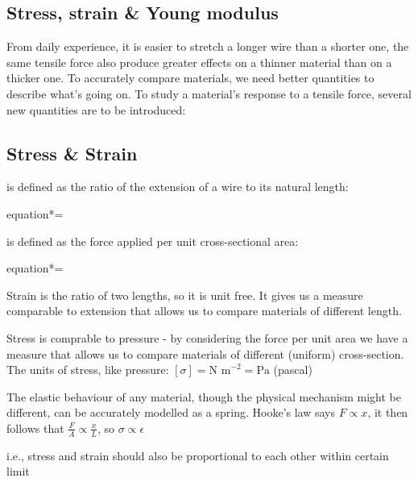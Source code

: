 \subsection{Stress, strain \& Young modulus}

From daily experience, it is easier to stretch a longer wire than a shorter one, the same tensile force also produce greater effects on a thinner material than on a thicker one. To accurately compare materials, we need better quantities to describe what's going on. To study a material's response to a tensile force, several new quantities are to be introduced:

\subsection{Stress \& Strain}

\begin{ilight}
	\centering {} is defined as the ratio of the extension of a wire to its natural length: \begin{empheq}[box=\tcbhighmath]{equation*}{\epsilon = }	\end{empheq}
\end{ilight}

\begin{ilight}
	\centering {} is defined as the force applied per unit cross-sectional area: 
	    \begin{empheq}[box=\tcbhighmath]{equation*}{\sigma = }\end{empheq}
\end{ilight}

Strain is the ratio of two lengths, so it is unit free. It gives us a measure comparable to extension that allows us to compare materials of different length.

Stress is comprable to pressure - by considering the force per unit area we have a measure that allows us to compare materials of different (uniform) cross-section. The units of stress, like pressure: $[\sigma] = \text{N m}^{-2} = \text{Pa}$ (pascal)

The elastic behaviour of any material, though the physical mechanism might be different, can be accurately modelled as a spring. Hooke's law says $F \propto x$, it then follows that $\frac{F}{A} \propto \frac{x}{L}$, so $\sigma \propto \epsilon$

i.e., stress and strain should also be proportional to each other within certain limit

